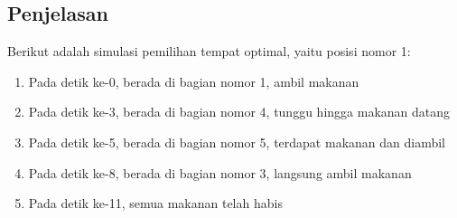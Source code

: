 \documentclass{article}
\begin{document}
\subsection*{Penjelasan}
Berikut adalah simulasi pemilihan tempat optimal, yaitu posisi nomor 1:

\begin{enumerate}
    \setlength{\itemsep}{0pt}
    \item Pada detik ke-0, berada di bagian nomor 1, ambil makanan
    \item Pada detik ke-3, berada di bagian nomor 4, tunggu hingga makanan datang
    \item Pada detik ke-5, berada di bagian nomor 5, terdapat makanan dan diambil
    \item Pada detik ke-8, berada di bagian nomor 3, langsung ambil makanan
    \item Pada detik ke-11, semua makanan telah habis
\end{enumerate}

\pagebreak
\end{document}
